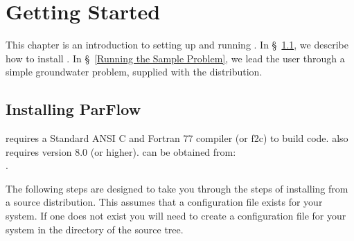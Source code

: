 
\chapter{Getting Started}
\label{Getting Started}

This chapter is an introduction to setting up and running \parflow{}.
In \S~\ref{Installing ParFlow}, we describe how to install \parflow{}.
In \S~\ref{Running the Sample Problem}, we lead the user through a
simple groundwater problem, supplied with the \parflow{} distribution.


\section{Installing ParFlow}
\label{Installing ParFlow}

\parflow{} requires a Standard ANSI C and Fortran 77 compiler (or f2c)
to build code.  \parflow{} also requires  version 8.0 (or
higher).   can be obtained from: \\
.  

The following steps are designed to take you through the steps of
installing \parflow{} from a source distribution.  This assumes that 
a configuration file exists for your system.  If one does not exist
you will need to create a configuration file for your system in
the  directory of the \parflow{} source tree.

